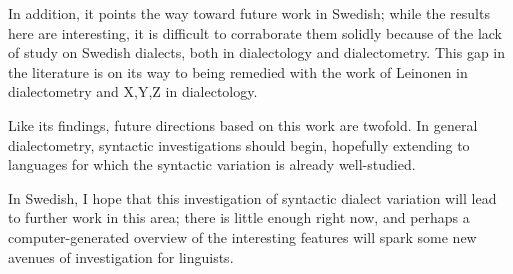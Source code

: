 In addition, it points the way toward future work in Swedish; while
the results here are interesting, it is difficult to corraborate them
solidly because of the lack of study on Swedish dialects, both in
dialectology and dialectometry. This gap in the literature is on its
way to being remedied with the work of Leinonen in dialectometry and
X,Y,Z in dialectology.

Like its findings, future directions based on this work are
twofold. In general dialectometry, syntactic investigations should
begin, hopefully extending to languages for which the syntactic
variation is already well-studied.

In Swedish, I hope that this investigation of syntactic dialect
variation will lead to further work in this area; there is little
enough right now, and perhaps a computer-generated overview of the
interesting features will spark some new avenues of investigation for
linguists.

